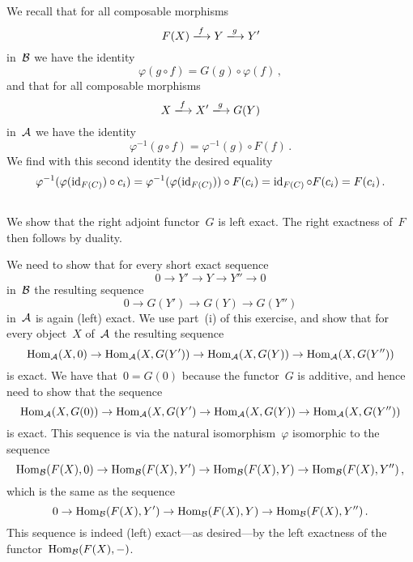 We recall that for all composable morphisms
\[
  F(X)
  \xlongto{f}
  Y
  \xlongto{g}
  Y'
\]
in~$\mathcal{B}$ we have the identity
\[
  \varphi(g \circ f)
  =
  G(g) \circ \varphi(f) \,,
\]
and that for all composable morphisms
\[
  X
  \xlongto{f}
  X'
  \xlongto{g}
  G(Y)
\]
in~$\mathcal{A}$ we have the identity
\[
  \varphi^{-1}(g \circ f)
  =
  \varphi^{-1}(g) \circ F(f) \,.
\]
We find with this second identity the desired equality
\[
  \varphi^{-1}(\varphi(\operatorname{id}_{F(C)}) \circ c_i)
  =
  \varphi^{-1}(\varphi(\operatorname{id}_{F(C)})) \circ F(c_i)
  =
  \operatorname{id}_{F(C)} \circ F(c_i)
  =
  F(c_i) \,.
\]





\subsection{}

We show that the right adjoint functor~$G$ is left exact.
The right exactness of~$F$ then follows by duality.

We need to show that for every short exact sequence
\[
  0
  \to
  Y'
  \to
  Y
  \to
  Y''
  \to
  0
\]
in~$\mathcal{B}$ the resulting sequence
\[
  0
  \to
  G(Y')
  \to
  G(Y)
  \to
  G(Y'')
\]
in~$\mathcal{A}$ is again (left) exact.
We use part~(i) of this exercise, and show that for every object~$X$ of~$\mathcal{A}$ the resulting sequence
\[
  \operatorname{Hom}_{\mathcal{A}}(X,0)
  \to
  \operatorname{Hom}_{\mathcal{A}}(X,G(Y'))
  \to
  \operatorname{Hom}_{\mathcal{A}}(X,G(Y))
  \to
  \operatorname{Hom}_{\mathcal{A}}(X,G(Y''))
\]
is exact.
We have that~$0 = G(0)$ because the functor~$G$ is additive, and hence need to show that the sequence
\[
  \operatorname{Hom}_{\mathcal{A}}(X,G(0))
  \to
  \operatorname{Hom}_{\mathcal{A}}(X,G(Y')
  \to
  \operatorname{Hom}_{\mathcal{A}}(X,G(Y))
  \to
  \operatorname{Hom}_{\mathcal{A}}(X,G(Y''))
\]
is exact.
This sequence is via the natural isomorphism~$\varphi$ isomorphic to the sequence
\[
  \operatorname{Hom}_{\mathcal{B}}(F(X),0)
  \to
  \operatorname{Hom}_{\mathcal{B}}(F(X),Y')
  \to
  \operatorname{Hom}_{\mathcal{B}}(F(X),Y)
  \to
  \operatorname{Hom}_{\mathcal{B}}(F(X),Y'') \,,
\]
which is the same as the sequence
\[
  0
  \to
  \operatorname{Hom}_{\mathcal{B}}(F(X),Y')
  \to
  \operatorname{Hom}_{\mathcal{B}}(F(X),Y)
  \to
  \operatorname{Hom}_{\mathcal{B}}(F(X),Y'') \,.
\]
This sequence is indeed (left) exact---as desired---by the left exactness of the functor~$\operatorname{Hom}_{\mathcal{B}}(F(X),-)$.






